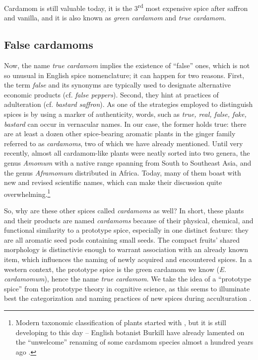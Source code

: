 \documentclass[12pt]{article}
\begin{document}
Cardamom is still valuable today, it is the 3\textsuperscript{rd} most expensive spice after saffron and vanilla, and it is also known as \textit{green cardamom} and \textit{true cardamom}. 



\subsection{False cardamoms}

Now, the name \textit{true cardamom} implies the existence of ``false'' ones, which is not so unusual in English spice nomenclature; it can happen for two reasons. First, the term \textit{false} and its synonyms are typically used to designate alternative economic products (cf. \textit{false peppers}). Second, they hint at practices of adulteration (cf. \textit{bastard saffron}). As one of the strategies employed to distinguish spices is by using a marker of authenticity, words, such as \textit{true, real, false, fake, bastard} can occur in vernacular names. In our case, the former holds true: there are at least a dozen other spice-bearing aromatic plants in the ginger family referred to as \textit{cardamoms}, two of which we have already mentioned. Until very recently, almost all cardamom-like plants were neatly sorted into two genera, the genus \textit{Amomum} with a native range spanning from South to Southeast Asia, and the genus \textit{Aframomum} distributed in Africa. Today, many of them boast with new and revised scientific names, which can make their discussion quite overwhelming.\footnote{Modern taxonomic classification of plants started with \textcite{linnaeus_1758_systema}, but it is still developing to this day -- English botanist Burkill have already lamented on the ``unwelcome'' renaming of some cardamom species almost a hundred years ago \parencite[see][]{burkill_1930_cardamoms}.}

So, why are these other spices called \textit{cardamoms} as well? In short, these plants and their products are named \textit{cardamoms} because of their physical, chemical, and functional similarity to a prototype spice, especially in one distinct feature: they are all aromatic seed pods containing small seeds. The compact fruits' shared morphology is distinctivie enough to warrant association with an already known item, which influences the naming of newly acquired and encountered spices. In a western context, the prototype spice is the green cardamom we know (\textit{E. cardamomum}), hence the name \textit{true cardamom}. We take the idea of a ``prototype spice'' from the prototype theory in cognitive science, as this seems to illuminate best the categorization and naming practices of new spices during acculturation \Parencite[see][]{parti_2023_mapping}.
\end{document}
